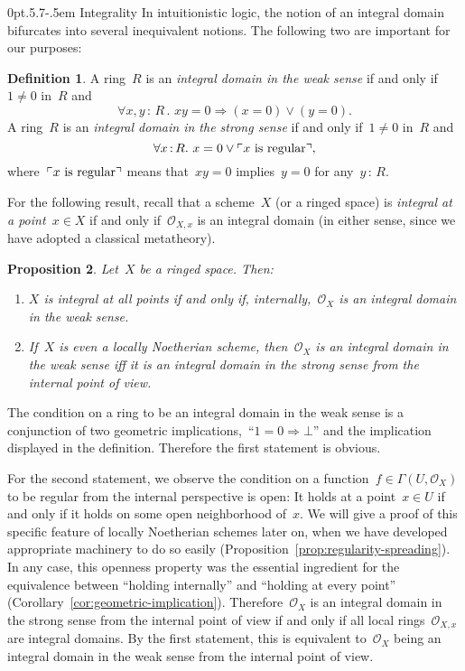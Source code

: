 \documentclass[10pt,reqno,a4paper]{amsbook}
\makeatletter
\theoremstyle{definition}
\newtheorem{defn}{Definition}[section]
\theoremstyle{plain}
\newtheorem{prop}[defn]{Proposition}
\theoremstyle{remark}
\renewcommand{\O}{\mathcal{O}}
\newcommand{\?}{\,{:}\,}
\renewcommand{\_}{\mathpunct{.}\,}
\newcommand{\speak}[1]{\ulcorner\text{\textnormal{#1}}\urcorner}
\renewenvironment{proof}[1][\proofname]{\par
  \pushQED{\qed}%
  \normalfont \topsep6\p@\@plus6\p@\relax
  \trivlist
  \item[\hskip\labelsep
        \itshape
    #1\@addpunct{.}]\ignorespaces
}{%
  \popQED\endtrivlist\@endpefalse
}
\def\subsection{\@startsection{subsection}{2}%
  {0pt}{.5\linespacing\@plus.7\linespacing}{-.5em}%
  {\normalfont\bfseries}}
\makeatother
\begin{document}
\subsection{Integrality}\label{sect:integrality}
In intuitionistic logic, the notion of an integral
domain bifurcates into several inequivalent notions. The following two are
important for our purposes:
\begin{defn}\label{defn:integral-domain}
A ring~$R$ is an \emph{integral domain in the weak sense} if and
only if~$1 \neq 0$ in~$R$ and
\[ \forall x,y\?R\_ xy = 0 \Longrightarrow (x = 0) \vee (y = 0). \]
A ring~$R$ is an \emph{integral domain in the strong sense} if and only if~$1
\neq 0$ in~$R$ and
\[ \forall x\?R\_ x = 0 \vee \speak{$x$ is regular}, \]
where~$\speak{$x$ is regular}$ means that~$xy = 0$ implies~$y = 0$ for any~$y \?
R$.\end{defn}

For the following result, recall that a scheme~$X$ (or a ringed space) is
\emph{integral at a point~$x \in X$} if and only if~$\O_{X,x}$ is an integral
domain (in either sense, since we have adopted a classical metatheory).

\begin{prop}\label{prop:internal-integrality}
Let~$X$ be a ringed space. Then:
\begin{enumerate}
\item $X$ is integral at all points if and only if, internally,~$\O_X$ is an
integral domain in the weak sense.
\item If~$X$ is even a locally Noetherian scheme, then~$\O_X$ is an integral
domain in the weak sense iff it is an integral domain in the strong sense from
the internal point of view.
\end{enumerate}
\end{prop}
\begin{proof}The condition on a ring to be an integral domain in the weak sense
is a conjunction of two geometric implications,~``$1 = 0 \Rightarrow \bot$''
and the implication displayed in the definition. Therefore the first statement
is obvious.

For the second statement, we observe the condition on a function~$f \in
\Gamma(U,\O_X)$ to be regular from the internal perspective is open: It holds
at a point~$x \in U$ if and only if it holds on some open neighborhood of~$x$.
We will give a proof of this specific feature of locally Noetherian schemes
later on, when we have developed appropriate machinery to do so easily
(Proposition~\ref{prop:regularity-spreading}). In any case, this openness
property was the essential ingredient for the equivalence between ``holding
internally'' and ``holding at every point''
(Corollary~\ref{cor:geometric-implication}). Therefore~$\O_X$ is an integral
domain in the strong sense from the internal point of view if and only if all
local rings~$\O_{X,x}$ are integral domains. By the first statement, this is
equivalent to~$\O_X$ being an integral domain in the weak sense from the
internal point of view.
\end{proof}
\end{document}
